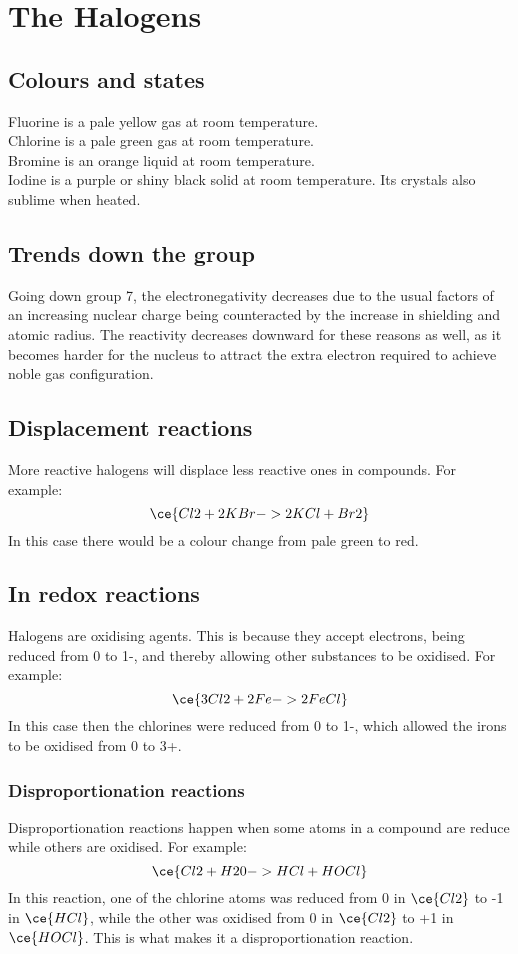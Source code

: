 \section{The Halogens}
\subsection{Colours and states}
Fluorine is a pale yellow gas at room temperature.
\\
Chlorine is a pale green gas at room temperature.
\\
Bromine is an orange liquid at room temperature.
\\
Iodine is a purple or shiny black solid at room temperature. Its crystals also sublime when heated.

\subsection{Trends down the group}
Going down group 7, the electronegativity decreases due to the usual factors of an increasing nuclear charge being counteracted by the increase in shielding and atomic radius. The reactivity decreases downward for these reasons as well, as it becomes harder for the nucleus to attract the extra electron required to achieve noble gas configuration.

\subsection{Displacement reactions}
More reactive halogens will displace less reactive ones in compounds. For example:
\begin{equation}
	\ce{Cl2 + 2KBr -> 2KCl + Br2}
\end{equation}
In this case there would be a colour change from pale green to red.

\subsection{In redox reactions}
Halogens are oxidising agents. This is because they accept electrons, being reduced from 0 to 1-, and thereby allowing other substances to be oxidised. For example:
\begin{equation}
	\ce{3Cl2 + 2Fe -> 2FeCl}
\end{equation}
In this case then the chlorines were reduced from 0 to 1-, which allowed the irons to be oxidised from 0 to 3+.

\subsubsection{Disproportionation reactions}
Disproportionation reactions happen when some atoms in a compound are reduce while others are oxidised. For example:
\begin{equation}
	\ce{Cl2 + H20 -> HCl + HOCl}
\end{equation}
In this reaction, one of the chlorine atoms was reduced from 0 in $\ce{Cl2}$ to -1 in $\ce{HCl}$, while the other was oxidised from 0 in $\ce{Cl2}$ to +1 in $\ce{HOCl}$. This is what makes it a disproportionation reaction.

